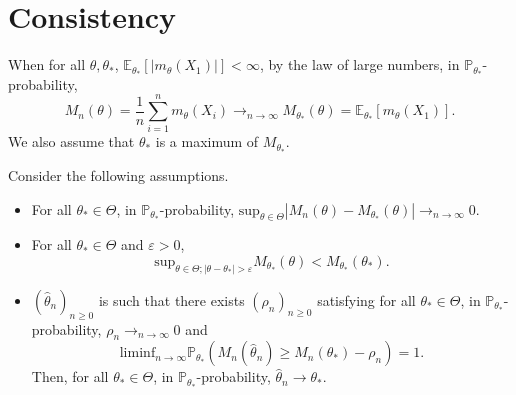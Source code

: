 \documentclass[english,graybox,envcountchap,envcountsame,sectrefs,shortlabels]{svmono}
\theoremstyle{style}
\newcommand{\eqsp}{}
\begin{document}
\section{Consistency}

When for all $\theta,\theta_*$, $\mathbb{E}_{\theta_*}[|m_\theta(X_1)|]<\infty$, by the law of large numbers, in $\mathbb{P}_{\theta_*}$-probability,
$$
M_n(\theta) = \frac{1}{n}\sum_{i=1}^nm_\theta(X_i) \rightarrow_{n\to\infty} M_{\theta_*}(\theta) = \mathbb{E}_{\theta_*}[m_\theta(X_1)]\eqsp.
$$
We also assume that $\theta_*$ is a maximum of $M_{\theta_*}$.
\begin{theorem}
Consider the following assumptions.
\begin{itemize}
\item For all $\theta_*\in\Theta$, in  $\mathbb{P}_{\theta_*}$-probability, $\mathrm{sup}_{\theta\in\Theta}|M_n(\theta)-M_{\theta_*}(\theta)|\to_{n\to \infty} 0$.
\item For all $\theta_*\in\Theta$ and $\varepsilon>0$,
$$
\mathrm{sup}_{\theta\in\Theta; |\theta-\theta_*|>\varepsilon}M_{\theta_*}(\theta)<M_{\theta_*}(\theta_*)\eqsp.
$$
\item $(\widehat \theta_n)_{n\geq 0}$ is such that there exists $(\rho_n)_{n\geq 0}$ satisfying for all $\theta_*\in\Theta$,  in  $\mathbb{P}_{\theta_*}$-probability, $\rho_n \to_{n\to \infty} 0$ and
$$
\mathrm{liminf}_{n\to \infty} \mathbb{P}_{\theta_*}\left(M_n(\widehat \theta_n)\geq M_n(\theta_*) -\rho_n\right) =1\eqsp.
$$
Then, for all $\theta_*\in\Theta$,  in  $\mathbb{P}_{\theta_*}$-probability, $\widehat \theta_n \to \theta_*$.
\end{itemize}
\end{theorem}
\end{document}
